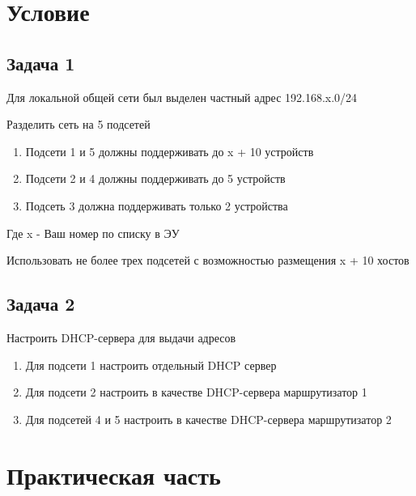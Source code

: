 \chapter{Условие}%
\label{cha:uslovie}

\section{Задача 1}%
\label{sec:task_1}
Для локальной общей сети был выделен частный адрес 192.168.x.0/24

Разделить сеть на 5 подсетей
\begin{enumerate}
    \item Подсети 1 и 5 должны поддерживать до x + 10 устройств

    \item Подсети 2 и 4 должны поддерживать до 5 устройств

    \item Подсеть 3 должна поддерживать только 2 устройства
\end{enumerate}
Где x - Ваш номер по списку в ЭУ

Использовать не более трех подсетей с возможностью размещения x + 10 хостов

\section{Задача 2}%
\label{sec:task_2}

Настроить DHCP-сервера для выдачи адресов
\begin{enumerate}
    \item Для подсети 1 настроить отдельный DHCP сервер
    \item Для подсети 2 настроить в качестве DHCP-сервера маршрутизатор 1
    \item Для подсетей 4 и 5 настроить в качестве DHCP-сервера маршрутизатор 2
\end{enumerate}

\chapter{Практическая часть}%
\label{cha:prakticheskaia_chast_}

